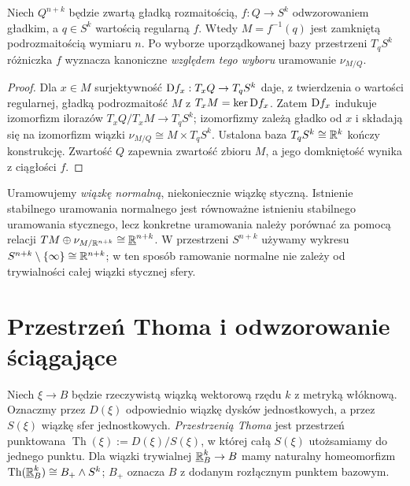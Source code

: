 \begin{lemat}
\label{lem:pt-regular-v9}
Niech $Q^{n+k}$ będzie zwartą gładką rozmaitością,
$f:Q\to S^k$ odwzorowaniem gładkim, a $q\in S^k$
wartością regularną $f$. Wtedy $M=f^{-1}(q)$
jest zamkniętą podrozmaitością wymiaru $n$.
Po wyborze uporządkowanej bazy przestrzeni $T_qS^k$
różniczka $f$ wyznacza kanoniczne \emph{względem tego
wyboru} uramowanie $\nu_{M/Q}$.
\end{lemat}
\begin{proof}
Dla $x\in M$ surjektywność
$\mathrm D f_x:T_xQ\to T_qS^k$ daje, z twierdzenia o wartości
regularnej, gładką podrozmaitość $M$ z
$T_xM=\ker\mathrm D f_x$. Zatem $\mathrm D f_x$ indukuje
izomorfizm ilorazów
$T_xQ/T_xM\to T_qS^k$; izomorfizmy zależą gładko od
$x$ i składają się na izomorfizm wiązki
$\nu_{M/Q}\cong M\times T_qS^k$.
Ustalona baza $T_qS^k\cong\mathbb{R}^k$ kończy konstrukcję.
Zwartość $Q$ zapewnia zwartość zbioru $M$, a jego
domkniętość wynika z ciągłości $f$.
\end{proof}

\begin{uwaga}
Uramowujemy \emph{wiązkę normalną}, niekoniecznie
wiązkę styczną. Istnienie stabilnego uramowania normalnego
jest równoważne istnieniu stabilnego uramowania stycznego,
lecz konkretne uramowania należy porównać za pomocą relacji
$TM\oplus\nu_{M/\mathbb{R}^{n+k}}\cong\underline{\mathbb{R}}^{n+k}$.
W przestrzeni $S^{n+k}$ używamy wykresu
$S^{n+k}\setminus\{\infty\}\cong\mathbb{R}^{n+k}$;
w ten sposób ramowanie normalne nie zależy od trywialności
całej wiązki stycznej sfery.
\end{uwaga}

\section{Przestrzeń Thoma i odwzorowanie ściągające}
\begin{definicja}
Niech $\xi\to B$ będzie rzeczywistą wiązką wektorową
rzędu $k$ z metryką włóknową. Oznaczmy przez $D(\xi)$
odpowiednio wiązkę dysków jednostkowych, a przez $S(\xi)$
wiązkę sfer jednostkowych. \emph{Przestrzenią Thoma} jest
przestrzeń punktowana
$\operatorname{Th}(\xi):=D(\xi)/S(\xi)$,
w której całą $S(\xi)$ utożsamiamy do jednego punktu.
Dla wiązki trywialnej
$\underline{\mathbb{R}}^k_B\to B$ mamy naturalny homeomorfizm
$\operatorname{Th}(\underline{\mathbb{R}}^k_B)\cong B_+\wedge S^k$;
$B_+$ oznacza $B$ z dodanym rozłącznym punktem bazowym.
\end{definicja}

